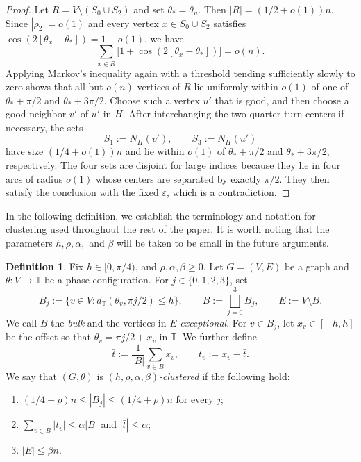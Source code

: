 \documentclass[reqno,11pt]{amsart}
\theoremstyle{definition}
\newtheorem{definition}{Definition}
\newcommand{\T}{\mathbb{T}}
\newcommand{\abs}[1]{\left\lvert #1\right\rvert}
\newcommand{\distT}{d_{\T}}
\begin{document}
\begin{proof}
Let $R=V\setminus(S_0\cup S_2)$ and set $\theta_*=\theta_u$.  Then
$\abs R=(1/2+o(1))n$.  Since $\abs{\rho_2}=o(1)$ and every vertex $x \in S_0\cup S_2$ satisfies $\cos(2[\theta_x-\theta_*]) = 1-o(1)$, we have
\begin{equation}\label{eq:remaining-doubled-phases}
    \sum_{x\in R}
       \bigl[1+\cos(2[\theta_x-\theta_*])\bigr]=o(n).
\end{equation}
Applying Markov's inequality again with a threshold tending sufficiently slowly to zero shows that all but $o(n)$ vertices of
$R$ lie uniformly within $o(1)$ of one of $\theta_*+\pi/2$ and
$\theta_*+3\pi/2$.  Choose such a vertex $u'$ that is good, and then choose
a good neighbor $v'$ of $u'$ in $H$.  After interchanging the two
quarter-turn centers if necessary, the sets
\[
    S_1:=N_H(v'),\qquad S_3:=N_H(u')
\]
have size $(1/4+o(1))n$ and lie within $o(1)$ of
$\theta_*+\pi/2$ and $\theta_*+3\pi/2$, respectively.  The four sets are
disjoint for large indices because they lie in four arcs of radius $o(1)$
whose centers are separated by exactly $\pi/2$.  They then satisfy the conclusion
with the fixed $\varepsilon$, which is a contradiction.
\end{proof}

In the following definition, we establish the terminology and notation for clustering used throughout the rest of the paper. It is worth noting that the parameters $h, \rho, \alpha,$ and $\beta$ will be taken to be small in the future arguments.

\begin{definition}\label{def:clustering-definition}
Fix $h\in[0,\pi/4)$, and $\rho, \alpha,\beta\geq 0$. Let $G = (V,E)$ be a graph and $\theta : V \to \mathbb{T}$ be a phase configuration. For $j\in\{0,1,2,3\}$, set
\[
    B_j:=\{v\in V:\distT(\theta_v,\pi j/2)\le h\},
    \qquad
    B:=\bigsqcup_{j=0}^3B_j,
    \qquad
    E:=V\setminus B.
\]
 We call $B$ the \emph{bulk} and the vertices in $E$ \emph{exceptional}.  For $v\in B_j$, let
$x_v\in[-h,h]$ be the offset so that $\theta_v=\pi j/2+x_v$ in $\T$. We further define
\[
    \bar t:=\frac1{\abs B}\sum_{v\in B}x_v,
    \qquad
    t_v:=x_v-\bar t.
\]
We say that $(G,\theta)$ is
\emph{$(h,\rho,\alpha,\beta)$-clustered} if the following hold:
\begin{enumerate}
\item $(1/4-\rho)n\le\abs{B_j}\le(1/4+\rho)n$ for every $j$;
\item $\sum_{v\in B}\abs{t_v}\le\alpha |B|$ and $|\bar t|\le\alpha$;
\item $\abs E\leq\beta n$.
\end{enumerate}
\end{definition}
\end{document}
